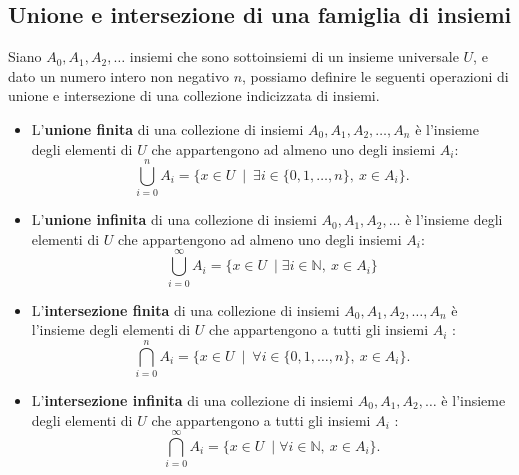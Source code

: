 

\subsection{Unione e intersezione di una famiglia di insiemi}

Siano $A_0, A_1, A_2, \ldots$ insiemi che sono sottoinsiemi di un insieme universale $U$, e dato un numero intero non negativo $n$, possiamo definire le seguenti operazioni di unione e intersezione di una collezione indicizzata di insiemi.

\begin{itemize}
    \item L'\textbf{unione finita} di una collezione di insiemi $A_0, A_1, A_2, \ldots, A_n$ è l'insieme degli elementi di $U$ che appartengono ad almeno uno degli insiemi $A_i$:
    \[
    \bigcup_{i=0}^{n} A_i = \{x \in U \ \mid \ \exists i \in \{0,1,\ldots,n\}, \ x \in A_i \}.
    \]
    
    \item L'\textbf{unione infinita} di una collezione di insiemi $A_0, A_1, A_2, \dots$ è l'insieme degli elementi di $U$ che appartengono ad almeno uno degli insiemi $A_i$:
    \[
    \bigcup_{i=0}^{\infty} A_i = \{x \in U \ \mid \exists i \in \mathbb{N}, \ x \in A_i \}
    \]

    \item L'\textbf{intersezione finita} di una collezione di insiemi $A_0, A_1, A_2, \dots, A_n$ è l'insieme degli elementi di $U$ che appartengono a tutti gli insiemi $A_i$ :
    \[
    \bigcap_{i=0}^{n} A_i = \{x \in U \ \mid \ \forall i \in \{0,1,\ldots,n\}, \ x \in A_i \}.
    \]
    
    \item L'\textbf{intersezione infinita} di una collezione di insiemi $A_0, A_1, A_2, \dots$ è l'insieme degli elementi di $U$ che appartengono a tutti gli insiemi $A_i$ :
    \[
    \bigcap_{i=0}^{\infty} A_i = \{x \in U \ \mid \forall i \in \mathbb{N}, \ x \in A_i \}.
    \]
\end{itemize}

